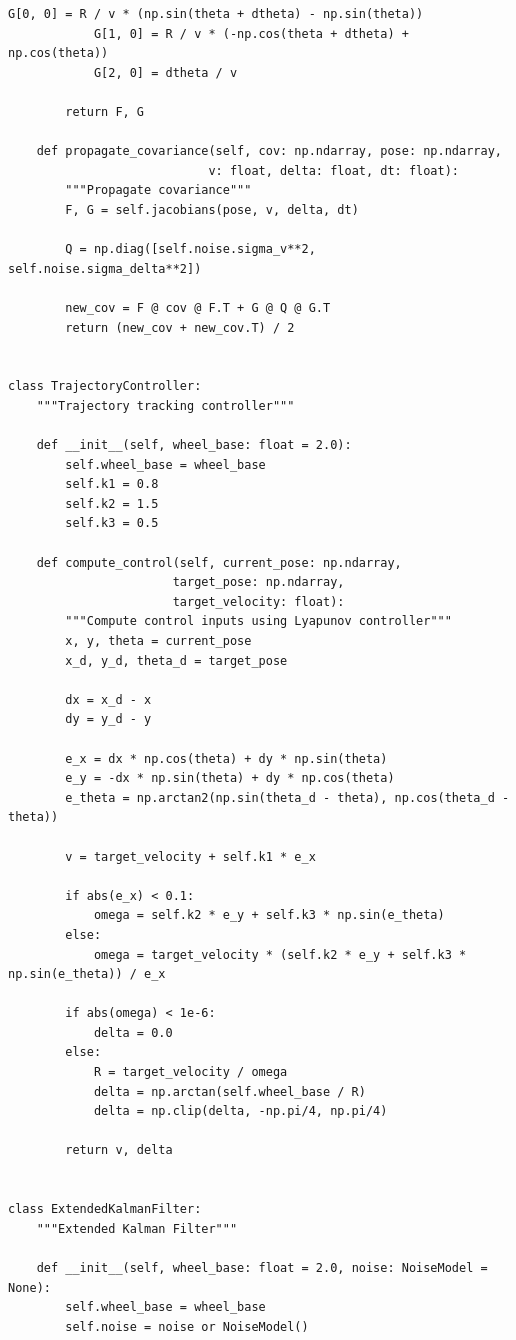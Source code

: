 \documentclass[12pt,a4paper]{report}
\begin{document}
\begin{lstlisting}[caption={Complete Simulation System (complete\_simulation.py)}]
            G[0, 0] = R / v * (np.sin(theta + dtheta) - np.sin(theta))
            G[1, 0] = R / v * (-np.cos(theta + dtheta) + np.cos(theta))
            G[2, 0] = dtheta / v
        
        return F, G
    
    def propagate_covariance(self, cov: np.ndarray, pose: np.ndarray, 
                            v: float, delta: float, dt: float):
        """Propagate covariance"""
        F, G = self.jacobians(pose, v, delta, dt)
        
        Q = np.diag([self.noise.sigma_v**2, self.noise.sigma_delta**2])
        
        new_cov = F @ cov @ F.T + G @ Q @ G.T
        return (new_cov + new_cov.T) / 2


class TrajectoryController:
    """Trajectory tracking controller"""
    
    def __init__(self, wheel_base: float = 2.0):
        self.wheel_base = wheel_base
        self.k1 = 0.8
        self.k2 = 1.5
        self.k3 = 0.5
        
    def compute_control(self, current_pose: np.ndarray, 
                       target_pose: np.ndarray, 
                       target_velocity: float):
        """Compute control inputs using Lyapunov controller"""
        x, y, theta = current_pose
        x_d, y_d, theta_d = target_pose
        
        dx = x_d - x
        dy = y_d - y
        
        e_x = dx * np.cos(theta) + dy * np.sin(theta)
        e_y = -dx * np.sin(theta) + dy * np.cos(theta)
        e_theta = np.arctan2(np.sin(theta_d - theta), np.cos(theta_d - theta))
        
        v = target_velocity + self.k1 * e_x
        
        if abs(e_x) < 0.1:
            omega = self.k2 * e_y + self.k3 * np.sin(e_theta)
        else:
            omega = target_velocity * (self.k2 * e_y + self.k3 * np.sin(e_theta)) / e_x
        
        if abs(omega) < 1e-6:
            delta = 0.0
        else:
            R = target_velocity / omega
            delta = np.arctan(self.wheel_base / R)
            delta = np.clip(delta, -np.pi/4, np.pi/4)
        
        return v, delta


class ExtendedKalmanFilter:
    """Extended Kalman Filter"""
    
    def __init__(self, wheel_base: float = 2.0, noise: NoiseModel = None):
        self.wheel_base = wheel_base
        self.noise = noise or NoiseModel()
        

\end{lstlisting}
\end{document}
